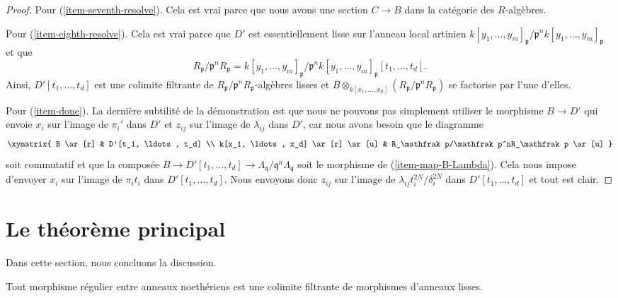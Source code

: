 \begin{proof}
\medskip\noindent
Pour (\ref{item-seventh-resolve}). Cela est vrai parce que nous avons une
section $C \to B$ dans la catégorie des $R$-algèbres.

\medskip\noindent
Pour (\ref{item-eighth-resolve}). Cela est vrai parce que $D'$ est
essentiellement lisse sur l'anneau local artinien
$k[y_1, \ldots, y_m]_\mathfrak p/\mathfrak p^n k[y_1, \ldots, y_m]_\mathfrak p$
et que
$$
R_\mathfrak p/\mathfrak p^nR_\mathfrak p =
k[y_1, \ldots, y_m]_\mathfrak p/
\mathfrak p^n k[y_1, \ldots, y_m]_\mathfrak p[t_1, \ldots, t_d].
$$
Ainsi, $D'[t_1, \ldots, t_d]$ est une colimite filtrante de
$R_\mathfrak p/\mathfrak p^nR_\mathfrak p$-algèbres lisses et
$B \otimes_{k[x_1, \ldots, x_d]} (R_\mathfrak p/\mathfrak p^nR_\mathfrak p)$
se factorise par l'une d'elles.

\medskip\noindent
Pour (\ref{item-done}). La dernière subtilité de la démonstration est que nous ne pouvons
pas simplement utiliser le morphisme $B \to D'$ qui envoie $x_i$ sur l'image de $\pi_i'$
dans $D'$ et $z_{ij}$ sur l'image de $\lambda_{ij}$ dans $D'$, 
car nous avons besoin que le diagramme
$$
\xymatrix{
B \ar[r] & D'[t_1, \ldots, t_d] \\
k[x_1, \ldots, x_d] \ar[r] \ar[u] &
R_\mathfrak p/\mathfrak p^nR_\mathfrak p \ar[u]
}
$$
soit commutatif et que la composée
$B \to D'[t_1, \ldots, t_d] \to
\Lambda_\mathfrak q/\mathfrak q^n\Lambda_\mathfrak q$
soit le morphisme de (\ref{item-map-B-Lambda}).
Cela nous impose d'envoyer $x_i$ sur l'image de
$\pi_i t_i$ dans $D'[t_1, \ldots, t_d]$.
Nous envoyons donc $z_{ij}$ sur l'image de
$\lambda_{ij} t_i^{2N} / \delta_i^{2N}$ dans $D'[t_1, \ldots, t_d]$
et tout est clair.
\end{proof}







\section{Le théorème principal}
\label{section-main}

\noindent
Dans cette section, nous concluons la discussion.

\begin{theorem}[Popescu]
\label{theorem-popescu}
Tout morphisme régulier entre anneaux noethériens est une colimite filtrante
de morphismes d'anneaux lisses.
\end{theorem}

